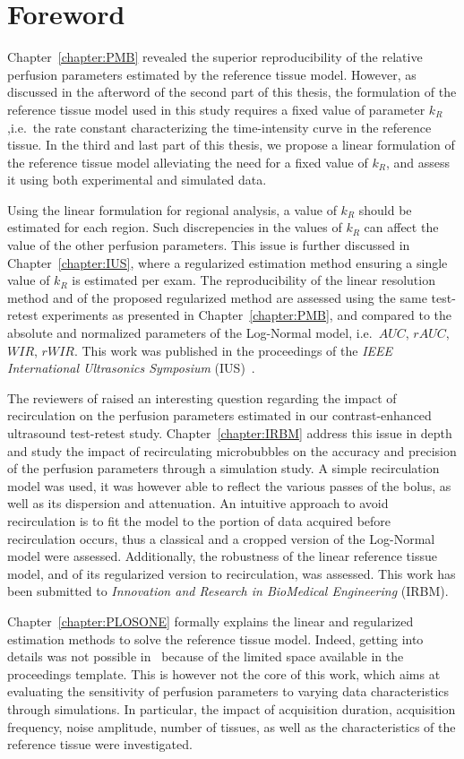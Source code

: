 \chapter*{Foreword}
Chapter~\ref{chapter:PMB} revealed the superior reproducibility of the relative perfusion parameters estimated by the reference tissue model.
However, as discussed in the afterword of the second part of this thesis, the formulation of the reference tissue model used in this study requires a fixed value of parameter $k_R$,i.e.~the rate constant characterizing the time-intensity curve in the reference tissue.
In the third and last part of this thesis, we propose a linear formulation of the reference tissue model alleviating the need for a fixed value of $k_R$, and assess it using both experimental and simulated data.

Using the linear formulation for regional analysis, a value of $k_R$ should be estimated for each region.
Such discrepencies in the values of $k_R$ can affect the value of the other perfusion parameters.
This issue is further discussed in Chapter~\ref{chapter:IUS}, where a regularized estimation method ensuring a single value of $k_R$ is estimated per exam.
The reproducibility of the linear resolution method and of the proposed regularized method are assessed using the same test-retest experiments as presented in Chapter~\ref{chapter:PMB}, and compared to the absolute and normalized parameters of the Log-Normal model, i.e.~$AUC$, $rAUC$, $WIR$, $rWIR$.
This work was published in the proceedings of the {\em IEEE International Ultrasonics Symposium} (IUS)~\cite{Doury:2016fi}.

The reviewers of \cite{Doury:2016fi} raised an interesting question regarding the impact of recirculation on the perfusion parameters estimated in our contrast-enhanced ultrasound test-retest study.
Chapter~\ref{chapter:IRBM} address this issue in depth and study the impact of recirculating microbubbles on the accuracy and precision of the perfusion parameters through a simulation study.
A simple recirculation model was used, it was however able to reflect the various passes of the bolus, as well as its dispersion and attenuation.
An intuitive approach to avoid recirculation is to fit the model to the portion of data acquired before recirculation occurs, thus a classical and a cropped version of the Log-Normal model were assessed.
Additionally, the robustness of the linear reference tissue model, and of its regularized version to recirculation, was assessed.
This work has been submitted to {\em Innovation and Research in BioMedical Engineering} (IRBM).

Chapter~\ref{chapter:PLOSONE} formally explains the linear and regularized estimation methods to solve the reference tissue model.
Indeed, getting into details was not possible in~\cite{Doury2017wn} because of the limited space available in the proceedings template.
This is however not the core of this work, which aims at evaluating the sensitivity of perfusion parameters to varying data characteristics through simulations.
In particular, the impact of acquisition duration, acquisition frequency, noise amplitude, number of tissues, as well as the characteristics of the reference tissue were investigated.